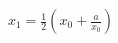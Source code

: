\documentclass[preview]{standalone}
\begin{document}
\begin{align*}
x_1 = \frac{1}{2}(x_0 + \frac{a}{x_0})
\end{align*}
\end{document}
